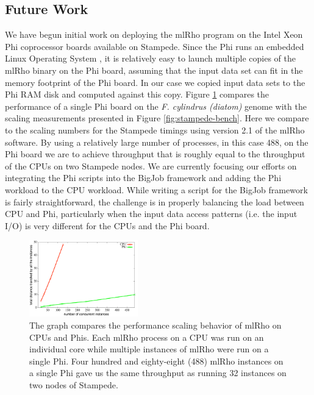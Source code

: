 \documentclass{sig-alternate}
\begin{document}
\subsection{Future Work}
We have begun initial work on deploying the mlRho program on the Intel Xeon Phi coprocessor boards
available on Stampede. Since the Phi runs an embedded Linux Operating System \cite{xeon_phi}, 
it is relatively easy to launch multiple copies of the mlRho binary on the Phi board, assuming
that the input data set can fit in the memory footprint of the Phi board. In our case we copied input data
sets to the Phi RAM disk and computed against this copy. Figure \ref{fig:mic-scaling} compares the performance
of a single Phi board on the {\it F. cylindrus (diatom)} genome with the scaling measurements presented in Figure
\ref{fig:stampede-bench}. Here we compare to the scaling numbers for the Stampede timings using version 2.1 of
the mlRho software. By using a relatively large number of processes, in this case 488, on the Phi board
we are to achieve throughput that is roughly equal to the throughput of the CPUs on two Stampede
nodes. We are currently focusing our efforts on integrating the Phi scripts into the BigJob framework and
adding the Phi workload to the CPU workload. While writing a script for the BigJob framework is fairly
straightforward, the challenge is in properly balancing the load between CPU and Phi, particularly when the
input data access patterns (i.e. the input I/O) is very different for the CPUs and the Phi board.
\begin{figure} %
\centering
\includegraphics[width=0.42\textwidth]{figures/mic-scaling.pdf}
\caption{The graph compares the performance scaling behavior of mlRho on CPUs and Phis. Each mlRho process on a CPU was run on an individual core while multiple instances of mlRho were run on a single Phi. Four hundred and eighty-eight (488) mlRho instances on a single Phi gave us the same throughput as running 32 instances on two nodes of Stampede.  }
\label{fig:mic-scaling}
\end{figure}
\\
\\
\end{document}
